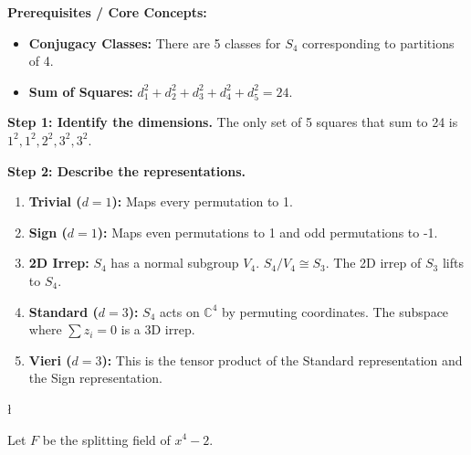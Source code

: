 \begin{solution}
\textbf{Prerequisites / Core Concepts:}
\begin{itemize}
    \item \textbf{Conjugacy Classes:} There are 5 classes for $S_4$ corresponding to partitions of 4.
    \item \textbf{Sum of Squares:} $d_1^2 + d_2^2 + d_3^2 + d_4^2 + d_5^2 = 24$.
\end{itemize}

\textbf{Step 1: Identify the dimensions.}
The only set of 5 squares that sum to 24 is $1^2, 1^2, 2^2, 3^2, 3^2$.

\textbf{Step 2: Describe the representations.}
\begin{enumerate}
    \item \textbf{Trivial ($d=1$):} Maps every permutation to 1.
    \item \textbf{Sign ($d=1$):} Maps even permutations to 1 and odd permutations to -1.
    \item \textbf{2D Irrep:} $S_4$ has a normal subgroup $V_4$. $S_4/V_4 \cong S_3$. The 2D irrep of $S_3$ lifts to $S_4$.
    \item \textbf{Standard ($d=3$):} $S_4$ acts on $\mathbb{C}^4$ by permuting coordinates. The subspace where $\sum z_i = 0$ is a 3D irrep.
    \item \textbf{Vieri ($d=3$):} This is the tensor product of the Standard representation and the Sign representation.
\end{enumerate}
\end{solution}

\begin{exercise}
\l\label{2013:8}

\label{algebra:2013:8}Let $F$ be the splitting field of $x^4 - 2$.
\end{exercise}

